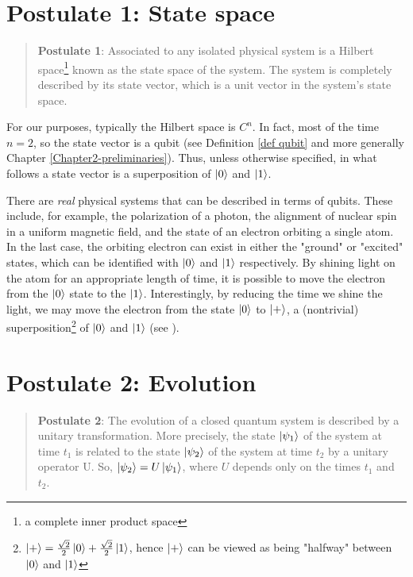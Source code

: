\section{Postulate 1: State space}


\begin{quote}
    \textbf{Postulate 1}: Associated to any isolated physical system is a Hilbert space\footnote{a complete inner product space} known as the state space of the system. The system is completely described by its state vector, which is a unit vector in the system's state space.
\end{quote}

For our purposes, typically the Hilbert space is $C^n$. In fact, most of the time $n=2$, so the state vector is a qubit (see Definition \ref{def qubit} and more generally Chapter \ref{Chapter2-preliminaries}).  Thus, unless otherwise specified, in what follows a state vector is a superposition of $\ket{0}$ and $\ket{1}$.

There are {\emph{real}} physical systems that can be described in terms of qubits.  These include, for example, the polarization of a photon, the alignment of nuclear spin in a uniform magnetic field, and the state of an electron orbiting a single atom.  In the last case, the orbiting electron can exist in either the "ground" or "excited" states, which can be identified with $\ket{0}$ and $\ket{1}$ respectively. By shining light on the atom for an appropriate length of time, it is possible to move the electron from the $\ket{0}$ state to the $\ket{1}$. Interestingly, by reducing the time we shine the light, we may move the electron from the state $\ket{0}$ to $\ket{+}$, a (nontrivial) superposition\footnote{$\ket{+}=\frac{\sqrt{2}}{2}\ket{0}+\frac{\sqrt{2}}{2}\ket{1}$, hence $\ket{+}$ can be viewed as being "halfway" between $\ket{0}$ and $\ket{1}$} of $\ket{0}$ and $\ket{1}$ (see \cite{Nielsen}).


\pagebreak
\section{Postulate 2: Evolution}

\begin{quote}
    \textbf{Postulate 2}: The evolution of a closed quantum system is described by a unitary transformation. More precisely, the state $\ket{\psi_1}$ of the system at time $t_1$ is related to the state $\ket{\psi_2}$ of the system at time $t_2$ by a unitary operator U.  So, $\ket{\psi_2}=U\ket{\psi_1}$, where $U$ depends only on the times $t_1$ and $t_2$.
\end{quote}


